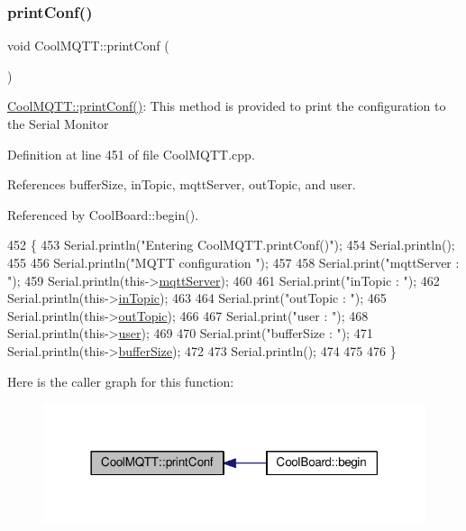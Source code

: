 \subsubsection{\texorpdfstring{print\+Conf()}{printConf()}}
{\footnotesize\ttfamily void Cool\+M\+Q\+T\+T\+::print\+Conf (\begin{DoxyParamCaption}{ }\end{DoxyParamCaption})}

\hyperlink{classCoolMQTT_a40553a0ad4b5ecf1cb4411ab54ca85fb}{Cool\+M\+Q\+T\+T\+::print\+Conf()}\+: This method is provided to print the configuration to the Serial Monitor 

Definition at line 451 of file Cool\+M\+Q\+T\+T.\+cpp.



References buffer\+Size, in\+Topic, mqtt\+Server, out\+Topic, and user.



Referenced by Cool\+Board\+::begin().


\begin{DoxyCode}
452 \{
453     Serial.println(\textcolor{stringliteral}{"Entering CoolMQTT.printConf()"});
454     Serial.println();   
455     
456     Serial.println(\textcolor{stringliteral}{"MQTT configuration "});
457 
458     Serial.print(\textcolor{stringliteral}{"mqttServer : "});
459     Serial.println(this->\hyperlink{classCoolMQTT_ab8bb951f87ddbf92db74c2ad16a3e53e}{mqttServer});
460 
461     Serial.print(\textcolor{stringliteral}{"inTopic : "});
462     Serial.println(this->\hyperlink{classCoolMQTT_a4492f52a441e83cc5151010317fdb52d}{inTopic});
463 
464     Serial.print(\textcolor{stringliteral}{"outTopic : "});
465     Serial.println(this->\hyperlink{classCoolMQTT_a109c786a17b463f9eeba046194279522}{outTopic});
466 
467     Serial.print(\textcolor{stringliteral}{"user : "});
468     Serial.println(this->\hyperlink{classCoolMQTT_a8cd47e45d457f908d4b4390b35aaee83}{user});
469 
470     Serial.print(\textcolor{stringliteral}{"bufferSize : "});
471     Serial.println(this->\hyperlink{classCoolMQTT_a7f3cf26b51d6770f216e42c5ef13ca9f}{bufferSize});
472 
473     Serial.println();
474 
475 
476 \}
\end{DoxyCode}
Here is the caller graph for this function\+:
\nopagebreak
\begin{figure}[H]
\begin{center}
\leavevmode
\includegraphics[width=318pt]{classCoolMQTT_a40553a0ad4b5ecf1cb4411ab54ca85fb_icgraph}
\end{center}
\end{figure}
\mbox{\label{classCoolMQTT_ace977b3e90ab14b1199fe5c4fb0a13ec}} 
